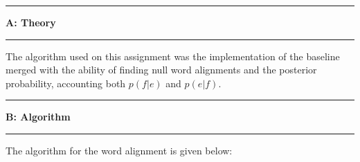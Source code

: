 \documentclass[11pt]{article}
\newcommand\question[2]{\vspace{.25in}\hrule\textbf{#1: #2}\vspace{.5em}\hrule\vspace{.10in}}
\begin{document}
\newcommand\NAME{Turash and Luiz}  %
\newcommand\ID{tmosharr \& lperesde}     %
\newcommand\HWNUM{}              %




\question{A}{Theory} 

The algorithm used on this assignment was the implementation of the baseline merged with the ability of finding null word alignments and the posterior probability, accounting both $p(f|e)$ and $p(e|f)$.

\question{B}{Algorithm} 

The algorithm for the word alignment is given below:	
\end{document}
